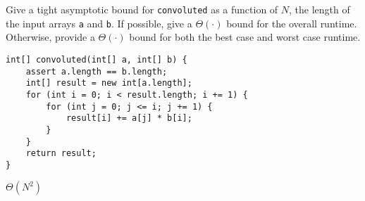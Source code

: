 \begin{blocksection}
\question Give a tight asymptotic bound for \lstinline$convoluted$ as a
function of $N$, the length of the input arrays \lstinline$a$ and
\lstinline$b$. If possible, give a $\Theta(\cdot)$ bound for the overall
runtime. Otherwise, provide a $\Theta(\cdot)$ bound for both the best case and
worst case runtime.

\begin{lstlisting}
int[] convoluted(int[] a, int[] b) {
    assert a.length == b.length;
    int[] result = new int[a.length];
    for (int i = 0; i < result.length; i += 1) {
        for (int j = 0; j <= i; j += 1) {
            result[i] += a[j] * b[i];
        }
    }
    return result;
}
\end{lstlisting}

\begin{solution}[0.5in]
$\Theta(N^2)$
\end{solution}
\end{blocksection}
